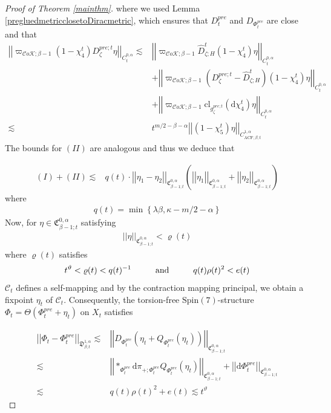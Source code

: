 \documentclass[psamsfonts]{amsart}
\theoremstyle{plain}
\theoremstyle{definition}{
\newtheorem{defi}{Definition}[section]
\newtheorem{ass}{Assumption}
\newtheorem*{nota}{Notation}}
\theoremstyle{remark}{
\newtheorem{rem}{Remark}
\newtheorem{ex}{Example}}
\theoremstyle{plain}{
\newtheorem{thm}{Theorem}[section]
\newtheorem{lem}{Lemma}[section]
\newtheorem{cor}{Corollary}[section]
\newtheorem{prop}{Proposition}[section]
\newtheorem{con}{Conjecture}[section]}
\newcommand{\m}[1]{{\mathrm{#1}}}
\newcommand{\und}[1]{\hspace{#1}\text{and}\hspace{#1}}
\begin{document}
\begin{proof}[Proof of Theorem \ref{mainthm}]
where we used Lemma \ref{pregluedmetricclosetoDiracmetric}, which ensures that $D^{pre}_t$ and $D_{\Phi^{pre}_t}$ are close and that 
\begin{align*}
    \left|\left|\varpi_{\mathcal{C}o\mathcal{K};\beta-1}(1-\chi^t_4)D^{pre;t}_\zeta\eta\right|\right|_{C^{0,\alpha}_t}\lesssim&\left|\left|\varpi_{\mathcal{C}o\mathcal{K};\beta-1}\widehat{D}^{t}_{\zeta;H}(1-\chi^t_4)\eta\right|\right|_{C^{0,\alpha}_t}\\
    &+\left|\left|\varpi_{\mathcal{C}o\mathcal{K};\beta-1}(D^{pre;t}_\zeta-\widehat{D}^{t}_{\zeta;H})(1-\chi^t_4)\eta\right|\right|_{C^{0,\alpha}_t}\\
    &+\left|\left|\varpi_{\mathcal{C}o\mathcal{K};\beta-1}\m{cl}_{g^{pre;t}_\zeta}(\m{d}\chi^t_4)\eta\right|\right|_{C^{0,\alpha}_t}\\
    \lesssim&t^{m/2-\beta-\alpha}\left|\left|(1-\chi^t_5)\eta\right|\right|_{C^{1,\alpha}_{\m{ACF};\beta;t}}
\end{align*}
The bounds for $(II)$ are analogous and thus we deduce that  

\begin{align*}
    (I)+(II)\lesssim&q(t)\cdot \left|\left|\eta_1-\eta_2\right|\right|_{\mathfrak{C}^{0,\alpha}_{\beta-1;t}}\left(\left|\left|\eta_1\right|\right|_{\mathfrak{C}^{0,\alpha}_{\beta-1;t}}+\left|\left|\eta_2\right|\right|_{\mathfrak{C}^{0,\alpha}_{\beta-1;t}}\right)
\end{align*}
where 
\begin{align*}
    q(t)=\min\left\{\lambda\beta,\kappa-m/2-\alpha\right\}
\end{align*}
Now, for $\eta\in\mathfrak{C}^{0,\alpha}_{\beta-1;t}$ satisfying 
\begin{align*}
    \left|\left|\eta\right|\right|_{\mathfrak{C}^{0,\alpha}_{\beta-1;t}}<\varrho(t)
\end{align*}
where $\varrho(t)$ satisfies
\begin{align*}
    t^{\vartheta}<\varrho(t)< q(t)^{-1}\und{1.0cm}q(t)\rho(t)^2<e(t)
\end{align*}
$\mathcal{C}_{t}$ defines a self-mapping and by the contraction mapping principal, we obtain a fixpoint $\eta_{t}$ of $\mathcal{C}_{t}$. Consequently, the torsion-free $\m{Spin}(7)$-structure $\Phi_{t}=\Theta(\Phi^{pre}_{t}+\eta_{t})$ on $X_{t}$ satisfies 

\begin{align}
    \left|\left|\Phi_{t}-\Phi^{pre}_{t}\right|\right|_{\mathfrak{D}^{1,\alpha}_{\beta;t}}\lesssim&\left|\left|D_{\Phi^{pre}_{t}}\left(\eta_{t}+Q_{\Phi_{t}^{pre}}(\eta_{t})\right)\right|\right|_{\mathfrak{C}^{0,\alpha}_{\beta-1;t}}\\\nonumber
    \lesssim&\left|\left|*_{\Phi^{pre}_{t}}\m{d}\pi_{+;\Phi^{pre}_{t}}Q_{\Phi_{t}^{pre}}(\eta_{t})\right|\right|_{\mathfrak{C}^{0,\alpha}_{\beta-1;t}}+\left|\left|\m{d}\Phi^{pre}_{t}\right|\right|_{\mathfrak{C}^{0,\alpha}_{\beta-1;t}}\\\nonumber
    \lesssim& q(t)\rho(t)^2+e(t)\lesssim t^\vartheta
\end{align}



\end{proof}
\end{document}
